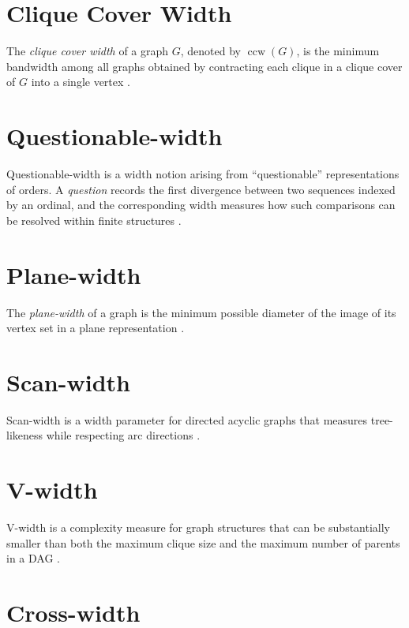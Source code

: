 \documentclass[10pt]{book}
\theoremstyle{definition}
\begin{document}
\section{Clique Cover Width}

The \emph{clique cover width} of a graph \(G\), denoted by \(\operatorname{ccw}(G)\), is the minimum bandwidth among all graphs obtained by contracting each clique in a clique cover of \(G\) into a single vertex \cite{shahrokhi2015clique,shahrokhi2017unit,shahrokhi2015bounds}.

\section{Questionable-width}

Questionable-width \cite{lyaudet2019finite,lyaudet2020first} is a width notion arising from ``questionable'' representations of orders.  
A \emph{question} records the first divergence between two sequences indexed by an ordinal, and the corresponding width measures how such comparisons can be resolved within finite structures \cite{lyaudet2019finite,lyaudet2020first}.

\section{Plane-width}

The \emph{plane-width} of a graph is the minimum possible diameter of the image of its vertex set in a plane representation \cite{Kaminski2008ThePO,Kaminski2008ThePO}.

\section{Scan-width}

Scan-width \cite{holtgrefe2024exact,holtgrefe2023computing} is a width parameter for directed acyclic graphs that measures tree-likeness while respecting arc directions \cite{scornavacca2022treewidth}.

\section{V-width}

V-width is a complexity measure for graph structures that can be substantially smaller than both the maximum clique size and the maximum number of parents in a DAG \cite{chickering2015selective}.

\section{Cross-width}
\end{document}
